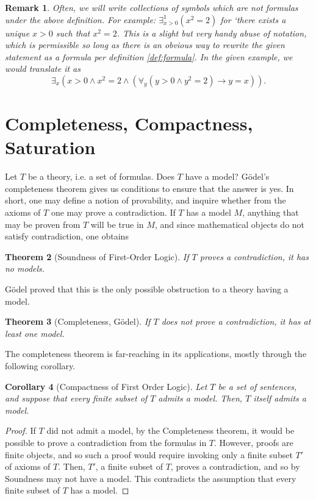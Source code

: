 \documentclass{article}
\newtheorem{theorem}{Theorem}[section]
\newtheorem{corollary}[theorem]{Corollary}
\newtheorem{remark}[theorem]{Remark}
\theoremstyle{nonumberplain}
\newtheorem{proof}{Proof}
\begin{document}
\begin{remark}
Often, we will write collections of symbols which are not formulas under the above definition. For example: $\exists^1_{x>0} (x^2 = 2)$ for `there exists a unique $x>0$ such that $x^2 = 2$. This is a slight but very handy abuse of notation, which is permissible so long as there is an obvious way to rewrite the given statement as a formula per definition \ref{def:formula}. In the given example, we would translate it as 
\begin{equation}
\exists_x (x > 0 \land x^2 = 2 \land (\forall_y (y > 0 \land y^2 = 2) \rightarrow y=x)).
\end{equation}
\end{remark}

\section{Completeness, Compactness, Saturation}

Let $T$ be a theory, i.e. a set of formulas. Does $T$ have a model? Gödel's completeness theorem gives us conditions to ensure that the answer is yes. In short, one may define a notion of provability, and inquire whether from the axioms of $T$ one may prove a contradiction. If $T$ has a model $M$, anything that may be proven from $T$ will be true in $M$, and since mathematical objects do not satisfy contradiction, one obtains
\begin{theorem}[Soundness of First-Order Logic]
If $T$ proves a contradiction, it has no models.
\end{theorem}

Gödel proved that this is the only possible obstruction to a theory having a model.
\begin{theorem}[Completeness, Gödel]
If $T$ does not prove a contradiction, it has at least one model.
\end{theorem}

The completeness theorem is far-reaching in its applications, mostly through the following corollary.
\begin{corollary}[Compactness of First Order Logic]
Let $T$ be a set of sentences, and suppose that every finite subset of $T$ admits a model. Then, $T$ itself admits a model.
\end{corollary}

\begin{proof}
If $T$ did not admit a model, by the Completeness theorem, it would be possible to prove a contradiction from the formulas in $T$. However, proofs are finite objects, and so such a proof would require invoking only a finite subset $T'$ of axioms of $T$. Then, $T'$, a finite subset of $T$, proves a contradiction, and so by Soundness may not have a model. This contradicts the assumption that every finite subset of $T$ has a model.
\end{proof}
\end{document}
